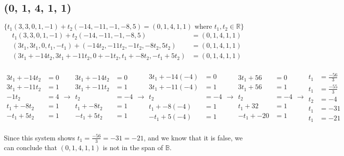 \documentclass{article}
\begin{document}
\subsection{(0, 1, 4, 1, 1)}
$\{t_1(3,3,0,1,-1) + t_2(-14,-11,-1,-8,5) = (0, 1, 4, 1, 1) \text{ where } 
t_1,t_2 \in \mathbb{R}\}$\\
\begin{equation*}
\begin{split}
t_1(3,3,0,1,-1) + t_2(-14,-11,-1,-8,5) &= (0, 1, 4, 1, 1)\\
(3t_1,3t_1,0,t_1,-t_1) + (-14t_2,-11t_2,-1t_2,-8t_2,5t_2) &= (0, 1, 4, 1, 1)\\
(3t_1 + -14t_2, 3t_1 + -11t_2, 0 + -1t_2, t_1 + -8t_2, -t_1 + 5t_2) &= (0, 1, 4, 1, 1)
\end{split}
\end{equation*}
\\
\begin{equation*}
\begin{split}
3t_1 + -14t_2 &= 0\\
3t_1 + -11t_2 &= 1\\
-1t_2 &= 4\\
t_1 + -8t_2 &= 1\\
-t_1 + 5t_2 &= 1
\end{split}
\xrightarrow{}
\begin{split}
3t_1 + -14t_2 &= 0\\
3t_1 + -11t_2 &= 1\\
t_2 &= -4\\
t_1 + -8t_2 &= 1\\
-t_1 + 5t_2 &= 1
\end{split}
\xrightarrow{}
\begin{split}
3t_1 + -14(-4) &= 0\\
3t_1 + -11(-4) &= 1\\
t_2 &= -4\\
t_1 + -8(-4) &= 1\\
-t_1 + 5(-4) &= 1
\end{split}
\xrightarrow{}
\begin{split}
3t_1 + 56 &= 0\\
3t_1 + 56 &= 1\\
t_2 &= -4\\
t_1 + 32 &= 1\\
-t_1 + -20 &= 1
\end{split}
\xrightarrow{}
\begin{split}
t_1 &= \frac{-56}{3}\\
t_1 &= \frac{-55}{3}\\
t_2 &= -4\\
t_1 &= -31\\
t_1 &= -21
\end{split}
\end{equation*}\\
Since this system shows $t_1 = \frac{-56}{3} = -31 = -21$, and we know that it
is false, we can conclude that $(0, 1, 4, 1, 1)$ is not in the span of
$\mathbb{B}$.\\
\end{document}
